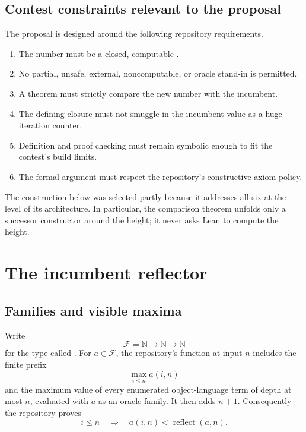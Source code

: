 \documentclass[11pt]{article}
\theoremstyle{definition}
\theoremstyle{remark}
\newcommand{\Nat}{\mathbb N}
\newcommand{\Fam}{\mathcal F}
\newcommand{\lean}[1]{\texttt{\detokenize{#1}}}
\begin{document}
\subsection{Contest constraints relevant to the proposal}

The proposal is designed around the following repository requirements.
\begin{enumerate}[leftmargin=*]
\item The number must be a closed, computable \lean{Nat}.
\item No partial, unsafe, external, noncomputable, or oracle stand-in is
      permitted.
\item A theorem must strictly compare the new number with the incumbent.
\item The defining closure must not smuggle in the incumbent value as a huge
      iteration counter.
\item Definition and proof checking must remain symbolic enough to fit the
      contest's build limits.
\item The formal argument must respect the repository's constructive axiom
      policy.
\end{enumerate}

The construction below was selected partly because it addresses all six at the
level of its architecture.  In particular, the comparison theorem unfolds only
a successor constructor around the height; it never asks Lean to compute the
height.

\section{The incumbent reflector}

\subsection{Families and visible maxima}

Write
\[
 \Fam=\Nat\to\Nat\to\Nat
\]
for the type called \lean{Family}.  For \(a\in\Fam\), the repository's
\lean{reflect} function at input \(n\) includes the finite prefix
\[
 \max_{i\le n} a(i,n)
\]
and the maximum value of every enumerated object-language term of depth at most
\(n\), evaluated with \(a\) as an oracle family.  It then adds \(n+1\).
Consequently the repository proves
\begin{equation}\label{eq:oracle}
 i\le n\quad\Longrightarrow\quad a(i,n)<\operatorname{reflect}(a,n).
\end{equation}
\end{document}
